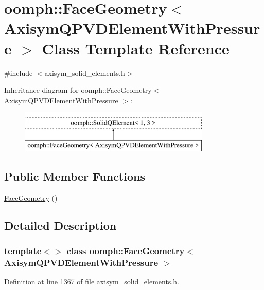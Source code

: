 \hypertarget{classoomph_1_1FaceGeometry_3_01AxisymQPVDElementWithPressure_01_4}{}\section{oomph\+:\+:Face\+Geometry$<$ Axisym\+Q\+P\+V\+D\+Element\+With\+Pressure $>$ Class Template Reference}
\label{classoomph_1_1FaceGeometry_3_01AxisymQPVDElementWithPressure_01_4}


{\ttfamily \#include $<$axisym\+\_\+solid\+\_\+elements.\+h$>$}

Inheritance diagram for oomph\+:\+:Face\+Geometry$<$ Axisym\+Q\+P\+V\+D\+Element\+With\+Pressure $>$\+:\begin{figure}[H]
\begin{center}
\leavevmode
\includegraphics[height=2.000000cm]{classoomph_1_1FaceGeometry_3_01AxisymQPVDElementWithPressure_01_4}
\end{center}
\end{figure}
\subsection*{Public Member Functions}
\begin{DoxyCompactItemize}
\item 
\hyperlink{classoomph_1_1FaceGeometry_3_01AxisymQPVDElementWithPressure_01_4_aaf6fde56d56e6aad4dc0bfe60d4bf694}{Face\+Geometry} ()
\end{DoxyCompactItemize}


\subsection{Detailed Description}
\subsubsection*{template$<$$>$\newline
class oomph\+::\+Face\+Geometry$<$ Axisym\+Q\+P\+V\+D\+Element\+With\+Pressure $>$}



Definition at line 1367 of file axisym\+\_\+solid\+\_\+elements.\+h.



